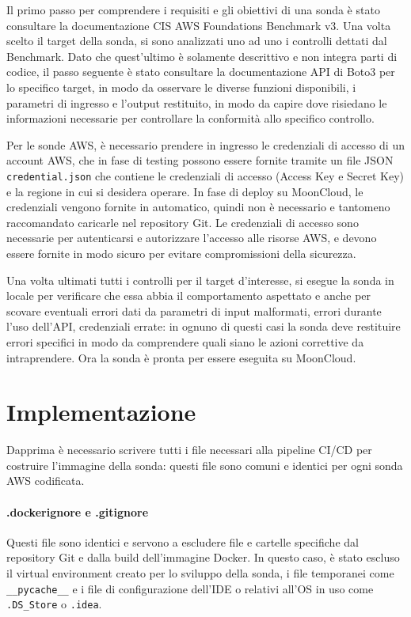 Il primo passo per comprendere i requisiti e gli obiettivi di una sonda è stato consultare la documentazione CIS AWS Foundations Benchmark v3. Una volta scelto il target della sonda, si sono analizzati uno ad uno i controlli dettati dal Benchmark. Dato che quest'ultimo è solamente descrittivo e non integra parti di codice, il passo seguente è stato consultare la documentazione API di Boto3 per lo specifico target, in modo da osservare le diverse funzioni disponibili, i parametri di ingresso e l'output restituito, in modo da capire dove risiedano le informazioni necessarie per controllare la conformità allo specifico controllo.

Per le sonde AWS, è necessario prendere in ingresso le credenziali di accesso di un account AWS, che in fase di testing possono essere fornite tramite un file JSON \texttt{credential.json} che contiene le credenziali di accesso (Access Key e Secret Key) e la regione in cui si desidera operare. In fase di deploy su MoonCloud, le credenziali vengono fornite in automatico, quindi non è necessario e tantomeno raccomandato caricarle nel repository Git. Le credenziali di accesso sono necessarie per autenticarsi e autorizzare l'accesso alle risorse AWS, e devono essere fornite in modo sicuro per evitare compromissioni della sicurezza.

Una volta ultimati tutti i controlli per il target d'interesse, si esegue la sonda in locale per verificare che essa abbia il comportamento aspettato e anche per scovare eventuali errori dati da parametri di input malformati, errori durante l'uso dell'API, credenziali errate: in ognuno di questi casi la sonda deve restituire errori specifici in modo da comprendere quali siano le azioni correttive da intraprendere. Ora la sonda è pronta per essere eseguita su MoonCloud.

\section{Implementazione}
\label{sec:implementazione}

Dapprima è necessario scrivere tutti i file necessari alla pipeline CI/CD per costruire l'immagine della sonda: questi file sono comuni e identici per ogni sonda AWS codificata.

\paragraph{.dockerignore e .gitignore} Questi file sono identici e servono a escludere file e cartelle specifiche dal repository Git e dalla build dell'immagine Docker. In questo caso, è stato escluso il virtual environment creato per lo sviluppo della sonda, i file temporanei come \texttt{\_\_pycache\_\_} e i file di configurazione dell'IDE o relativi all'OS in uso come \texttt{.DS\_Store} o \texttt{.idea}. 

